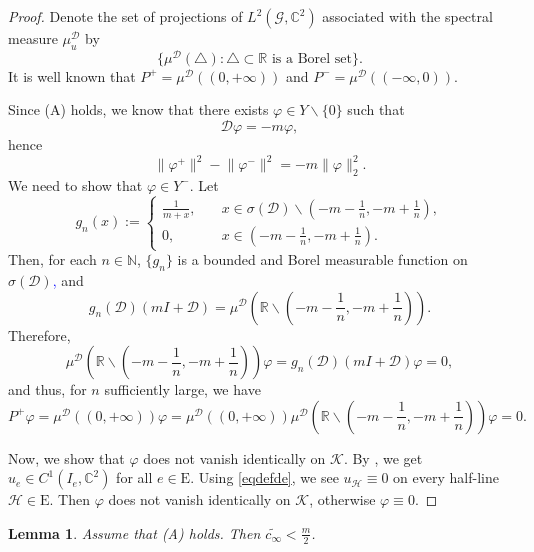 \documentclass[11pt]{amsart}
\newtheorem{lemma}[theorem]{Lemma}
\newcommand{\norm}[1]{\lVert#1\rVert}
\newcommand{\blue}[1]{\textcolor{blue}{#1}}
\newcommand{\D}{\mathcal{D}}
\newcommand{\G}{\mathcal{G}}
\newcommand{\K}{\mathcal{K}}
\numberwithin{equation}{section}
\begin{document}
\begin{proof}
      Denote the set of projections of $L^2(\G, \mathbb{C}^2)$ associated with the spectral measure $\mu_u^{\mathcal{D}}$ by $$\{\mu^{\mathcal{D}}(\triangle) : \triangle\subset \mathbb{R} \text{ is a Borel set}\}.$$
      It is well known that $P^+=\mu^{\mathcal{D}}((0, +\infty))$ and $P^-=\mu^{\mathcal{D}}((-\infty , 0))$.

      Since {\rm(A)} holds, we know that there exists $\varphi \in Y\backslash\{0\}$ such that
    \begin{equation*}
        \D\varphi = -m\varphi,
    \end{equation*}
    hence
    \begin{equation*}
            \norm{\varphi^+}^2 - \norm{\varphi^-}^2 =-m\norm{\varphi}_2^2.
    \end{equation*}
We need to show that $\varphi \in Y^-$. Let
    \[
  g_n(x):=
  \begin{cases}
    \frac{1}{m+x}, \quad  & x \in \sigma(\D)\backslash(-m-\frac{1}{n},-m+\frac{1}{n}),\\
    0,     & x \in (-m-\frac{1}{n},-m+\frac{1}{n}).
\end{cases}
\]
Then, for each $n \in\mathbb{N}$, $\{g_n\}$ is a bounded and Borel measurable function on $\sigma(\D)$\blue{,} and
\[
    g_n(\D)(mI+\D) = \mu^{\mathcal{D}}\left(\mathbb{R}\backslash(-m-\frac{1}{n},-m+\frac{1}{n})\right).
\]
Therefore,
\[
    \mu^{\mathcal{D}}\left(\mathbb{R}\backslash(-m-\frac{1}{n},-m+\frac{1}{n})\right)\varphi = g_n(\D)(mI+\D)\varphi =0,
\]
and thus, for $n$ sufficiently large, we have
\[
    P^+\varphi = \mu^{\mathcal{D}}((0,+\infty))\varphi =  \mu^{\mathcal{D}}((0,+\infty))\mu^{\mathcal{D}}\left(\mathbb{R}\backslash(-m-\frac{1}{n},-m+\frac{1}{n})\right)\varphi = 0.
\]


 Now, we show that $\varphi$ does not vanish identically on $\K$. By \cite[Remark 6 in Chapter 8]{Ha}, we get $u_e\in C^1(I_e,\mathbb{C}^2)$ for all $e \in \mathrm{E}$. Using \eqref{eqdefde}, we see $u_{\mathcal{H}} \equiv 0$ on every half-line $\mathcal{H}\in\mathrm{E}$. Then $\varphi$ does not vanish identically on $\K$, otherwise $\varphi \equiv 0$.
\end{proof}
\begin{lemma}\label{lemcin-a}
    Assume that {\rm(A)} holds. Then $\widetilde{c_\infty} < \frac{m}{2}$.
\end{lemma}
\end{document}
